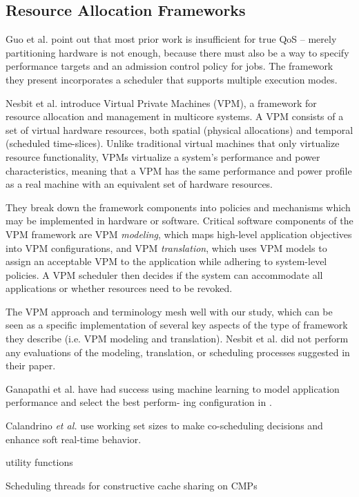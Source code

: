 \subsection{Resource Allocation Frameworks}

Guo et al. \cite{1331730} point out that most prior work is insufficient for true QoS -- merely partitioning hardware is not enough, because there must also be a way to specify performance targets and an admission control policy for jobs.
The framework they present incorporates a scheduler that supports multiple execution modes.

Nesbit et al. \cite{1436097} introduce Virtual Private Machines (VPM), a framework for resource allocation and management in multicore systems. A VPM consists of a set of virtual hardware resources, both spatial (physical allocations) and temporal (scheduled time-slices).  Unlike traditional virtual machines that only virtualize resource functionality, VPMs virtualize a system's performance and power characteristics, meaning that a VPM has the same performance and power profile as a real machine with an equivalent set of hardware resources.

They break down the framework components into policies and mechanisms which may be implemented in hardware or software. Critical software components of the VPM framework are VPM {\em modeling}, which maps high-level application objectives into VPM configurations, and VPM {\em translation}, which uses VPM models to assign an acceptable VPM to the application while adhering to system-level policies. A VPM scheduler then decides if the system can accommodate all applications or whether resources need to be revoked.

The VPM approach and terminology mesh well with our study, which can be seen as a specific implementation of several key aspects of the type of framework they describe (i.e. VPM modeling and translation). Nesbit et al. did not perform any evaluations of the modeling, translation, or scheduling processes suggested in their paper.

\cite{aiken-mspc06}
\cite{1006707}
\cite{genbrugge-isca07}
\cite{merkel-eurosys08}

Ganapathi et al. have had success using machine learning to model application performance and select the best perform- ing configuration in \cite{Archana}.

Calandrino \emph{et al.}\cite{unc} use working set sizes to make co-scheduling decisions and enhance soft real-time behavior.

\cite{1078411}
utility functions

\cite{1380585,975344,wasserman-book}


Scheduling threads for constructive cache sharing on CMPs
\cite{1248396}
